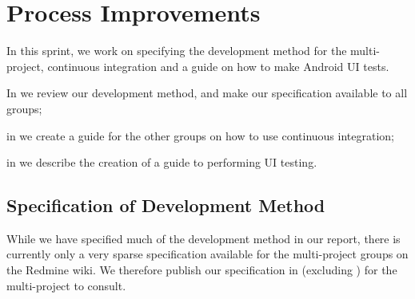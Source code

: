 \chapter{Process Improvements}\label{sec:process_improvements}
In this sprint, we work on specifying the development method for the multi-project, continuous integration and a guide on how to make Android UI tests.

\begin{chapterorganization}
  \item In  we review our development method, and make our specification available to all groups;
  \item in  we create a guide for the other groups on how to use continuous integration;
  \item in  we describe the creation of a guide to performing UI testing.
\end{chapterorganization}

\section{Specification of Development Method}\label{sec:processspecs}
While we have specified much of the development method in our report, there is currently only a very sparse specification available for the multi-project groups on the Redmine wiki. We therefore publish our specification in  (excluding ) for the multi-project to consult.

